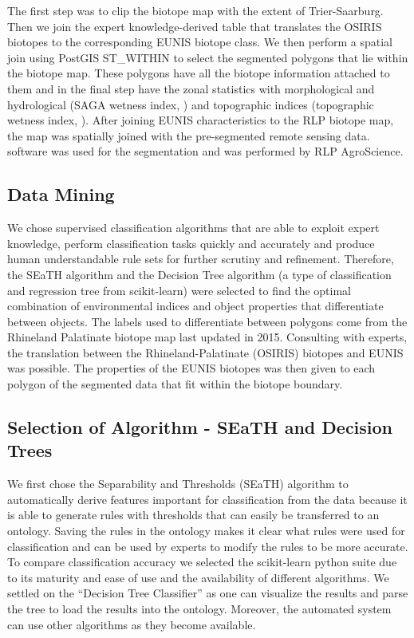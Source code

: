 \documentclass[authoryear, review,12pt,number]{elsarticle}
\begin{document}
The first step was to clip the biotope map with the extent of Trier-Saarburg.
Then we join the expert knowledge-derived table that translates the OSIRIS
biotopes to the corresponding EUNIS biotope class. We then perform a spatial
join using PostGIS ST\_WITHIN to select the segmented polygons that lie within
the biotope map. These polygons have all the biotope information
attached to them and in the final step have the zonal statistics with
morphological and hydrological (SAGA wetness index, ) and topographic indices 
(topographic wetness index, ). 
After joining EUNIS characteristics to the RLP
biotope map, the map was spatially joined with the pre-segmented remote sensing
data. software was used for the segmentation and was performed by RLP AgroScience. 
\subsection{Data Mining}
We chose supervised classification algorithms that are able to exploit expert
knowledge, perform classification tasks quickly and accurately and produce human
understandable rule sets for further scrutiny and refinement. Therefore, the
SEaTH algorithm and the Decision Tree algorithm (a type of classification and regression
tree from scikit-learn) were selected to find the optimal combination of 
environmental indices and
object properties that differentiate between objects. The labels used to
differentiate between polygons come from the Rhineland Palatinate biotope map
last updated in 2015. Consulting with experts, the translation between the
Rhineland-Palatinate (OSIRIS) biotopes and EUNIS was possible. The properties of
the EUNIS biotopes was then given to each polygon of the segmented data that
fit within the biotope boundary.
\subsection{Selection of Algorithm - SEaTH and Decision Trees}
We first chose the Separability and Thresholds
(SEaTH) \citep{Nussbaum2006} algorithm to automatically derive features important
for classification from the data because it is able to generate rules with
thresholds that can easily be transferred to an ontology. Saving the rules in
the ontology makes it clear what rules were used for classification and can be
used by experts to modify the rules to be more accurate. To compare
classification accuracy we selected the scikit-learn python suite
\citep{scikit-learn} due to its maturity and ease of use and the availability of
different algorithms. We settled on the ``Decision Tree Classifier'' as one can
visualize the results and parse the tree to load the results into the ontology.
Moreover, the automated system can use other algorithms as they become available.
\end{document}
